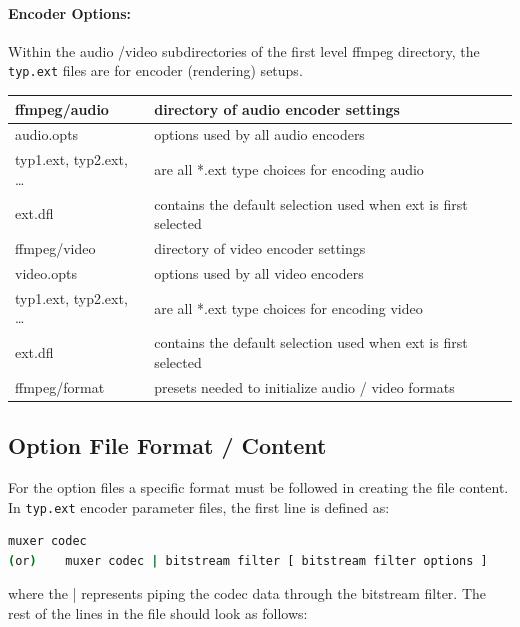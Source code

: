 \paragraph{Encoder Options:} Within the audio /video subdirectories of the first level ffmpeg directory, the \texttt{typ.ext} files are for encoder (rendering) setups.

\begin{center}
    \begin{longtable}{l p{23em}}
        \toprule
        ffmpeg/audio & directory of audio encoder settings \\
        \midrule
        audio.opts & options used by all audio encoders \\
        typ1.ext, typ2.ext, … & are all *.ext type choices for encoding audio \\
        ext.dfl & contains the default selection used when ext is first selected \\
        \midrule
        ffmpeg/video & directory of video encoder settings \\
        \midrule
        video.opts & options used by all video encoders \\
        typ1.ext, typ2.ext, … & are all *.ext type choices for encoding video \\
        ext.dfl & contains the default selection used when ext is first selected \\
        \midrule
        ffmpeg/format & presets needed to initialize audio / video formats \\
        \bottomrule
    \end{longtable}
\end{center}

\subsection{Option File Format / Content}%
\label{sub:option_file_format_content}

For the option files a specific format must be followed in creating the file content.
In \texttt{typ.ext} encoder parameter files, the first line is defined as:

\begin{lstlisting}[language=bash]
      muxer codec
(or) 	muxer codec | bitstream filter [ bitstream filter options ]
\end{lstlisting}

where the | represents piping the codec data through the bitstream filter. The rest of the lines in the file should look as follows:

